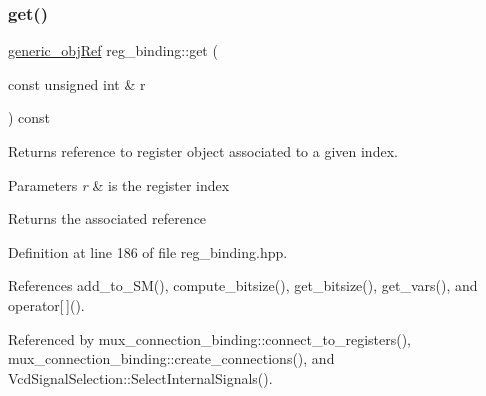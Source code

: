 \subsubsection{\texorpdfstring{get()}{get()}}
{\footnotesize\ttfamily \hyperlink{generic__obj_8hpp_acb533b2ef8e0fe72e09a04d20904ca81}{generic\+\_\+obj\+Ref} reg\+\_\+binding\+::get (\begin{DoxyParamCaption}\item[{const unsigned int \&}]{r }\end{DoxyParamCaption}) const\hspace{0.3cm}{\ttfamily [inline]}}



Returns reference to register object associated to a given index. 


\begin{DoxyParams}{Parameters}
{\em r} & is the register index \\
\hline
\end{DoxyParams}
\begin{DoxyReturn}{Returns}
the associated reference 
\end{DoxyReturn}


Definition at line 186 of file reg\+\_\+binding.\+hpp.



References add\+\_\+to\+\_\+\+S\+M(), compute\+\_\+bitsize(), get\+\_\+bitsize(), get\+\_\+vars(), and operator\mbox{[}$\,$\mbox{]}().



Referenced by mux\+\_\+connection\+\_\+binding\+::connect\+\_\+to\+\_\+registers(), mux\+\_\+connection\+\_\+binding\+::create\+\_\+connections(), and Vcd\+Signal\+Selection\+::\+Select\+Internal\+Signals().

